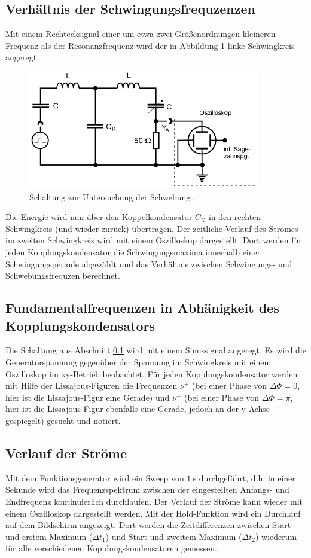 \subsection{Verhältnis der Schwingungsfrequzenzen}
\label{sec:verhaeltnis}
Mit einem Rechtecksignal einer um etwa zwei Größenordnungen kleineren Frequenz
als der Resonanzfrequenz wird der in Abbildung \ref{fig:messung1} linke Schwingkreis
angeregt.
\begin{figure}
  \centering
  \includegraphics[width=0.9\textwidth]{messung1.png}
  \caption{Schaltung zur Untersuchung der Schwebung \cite{sample}.}
  \label{fig:messung1}
\end{figure}
Die Energie wird nun über den Koppelkondensator $C_\text{K}$ in den
rechten Schwingkreis (und wieder zurück) übertragen. Der zeitliche Verlauf des
Stromes im zweiten Schwingkreis wird mit einem Oszilloskop dargestellt. Dort
werden für jeden Kopplungskondensator die Schwingungsmaxima innerhalb einer
Schwingungsperiode abgezählt und das Verhältnis zwischen Schwingungs- und
Schwebungsfrequzen berechnet.

\subsection{Fundamentalfrequenzen in Abhänigkeit des Kopplungskondensators}
Die Schaltung aus Abschnitt \ref{sec:verhaeltnis} wird mit einem Sinussignal
angeregt. Es wird die Generatorspannung gegenüber der Spannung im Schwingkreis
mit einem Oszilloskop im xy-Betrieb beobachtet. Für jeden Kopplungskondensator
werden mit Hilfe der Lissajous-Figuren die Frequenzen $\nu^{+}$ (bei einer Phase
von $\Delta \Phi = 0$, hier ist die Lissajous-Figur eine Gerade) und $\nu^{-}$
(bei einer Phase von $\Delta \Phi = \pi$, hier ist die Lissajous-Figur ebenfalls
eine Gerade, jedoch an der y-Achse gespiegelt) gesucht und notiert.

\subsection{Verlauf der Ströme}
Mit dem Funktionsgenerator wird ein Sweep von $\SI{1}{\second}$ durchgeführt,
d.h. in einer Sekunde wird das Frequenzspektrum zwischen der eingestellten
Anfangs- und Endfrequenz kontinuierlich durchlaufen. Der Verlauf der Ströme kann
wieder mit einem Oszilloskop dargestellt werden. Mit der Hold-Funktion wird ein
Durchlauf auf dem Bildschirm angezeigt. Dort werden die Zeitdifferenzen zwischen
Start und erstem Maximum ($\Delta t_1$) und Start und zweitem Maximum ($\Delta t_2$)
wiederum für alle verschiedenen Kopplungskondensatoren gemessen.

